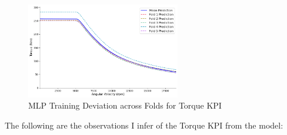 \documentclass{report} %
\begin{document}
\begin{figure}[H]
    \centering
    \includegraphics[width=0.6\textwidth]{./ReportImages/folds_dev_y1.png} 
    \caption{MLP Training Deviation across Folds for Torque \ac{KPI}} 
    \label{fig:MLP Training Deviation across Folds for Torque KPI}
\end{figure}

The following are the observations I infer of the Torque \ac{KPI} from the model:
\end{document}
